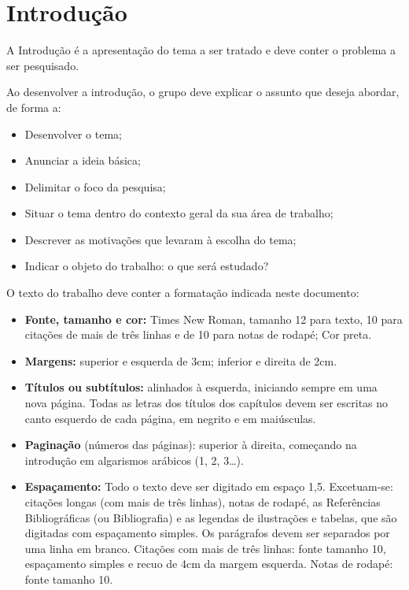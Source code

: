\chapter{Introdução}\label{cap:introducao}

A Introdução é a apresentação do tema a ser tratado e deve conter o problema
a ser pesquisado.

Ao desenvolver a introdução, o grupo deve explicar o assunto que deseja
abordar, de forma a:

\begin{itemize}
    \item Desenvolver o tema;
    \item Anunciar a ideia básica;
    \item Delimitar o foco da pesquisa;
    \item Situar o tema dentro do contexto geral da sua área de trabalho;
    \item Descrever as motivações que levaram à escolha do tema;
    \item Indicar o objeto do trabalho: o que será estudado?
\end{itemize}

O texto do trabalho deve conter a formatação indicada neste documento:

\begin{itemize}
    \item \textbf{Fonte, tamanho e cor:} Times New Roman, tamanho 12 para
          texto, 10 para citações de mais de três linhas e de 10 para notas
          de rodapé; Cor preta.
    \item \textbf{Margens:} superior e esquerda de 3cm; inferior e direita
          de 2cm.
    \item \textbf{Títulos ou subtítulos:} alinhados à esquerda, iniciando
          sempre em uma nova página. Todas as letras dos títulos dos
          capítulos devem ser escritas no canto esquerdo de cada página, em
          negrito e em maiúsculas.
    \item \textbf{Paginação} (números das páginas): superior à direita,
          começando na introdução em algarismos arábicos (1, 2, 3\ldots).
    \item \textbf{Espaçamento:} Todo o texto deve ser digitado em espaço
          1,5. Excetuam-se: citações longas (com mais de três linhas), notas
          de rodapé, as Referências Bibliográficas (ou Bibliografia) e as
          legendas de ilustrações e tabelas, que são digitadas com
          espaçamento simples. Os parágrafos devem ser separados por uma
          linha em branco. Citações com mais de três linhas: fonte tamanho
          10, espaçamento simples e recuo de 4cm da margem esquerda. Notas
          de rodapé: fonte tamanho 10.
\end{itemize}
